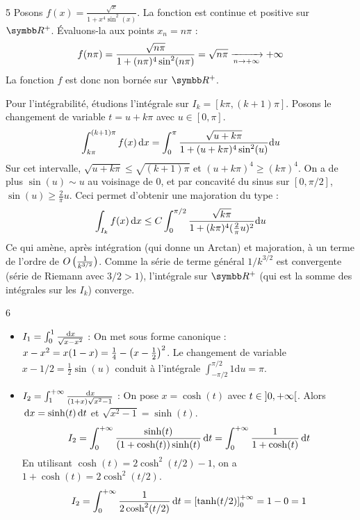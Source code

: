 \begin{correction}{5}
Posons $f(x) = \frac{\sqrt{x}}{1+x^4\sin^2(x)}$.
La fonction est continue et positive sur $\R^+$. Évaluons-la aux points $x_n = n\pi$ :
$$ f(n\pi) = \frac{\sqrt{n\pi}}{1 + (n\pi)^4\sin^2(n\pi)} = \sqrt{n\pi} \xrightarrow[n \to +\infty]{} +\infty $$
La fonction $f$ est donc non bornée sur $\R^+$.

Pour l'intégrabilité, étudions l'intégrale sur $I_k = [k\pi, (k+1)\pi]$. Posons le changement de variable $t = u + k\pi$ avec $u \in [0, \pi]$.
$$ \int_{k\pi}^{(k+1)\pi} f(x)\,\mathrm{d}x = \int_{0}^{\pi} \frac{\sqrt{u+k\pi}}{1 + (u+k\pi)^4\sin^2(u)}\mathrm{d}u $$
Sur cet intervalle, $\sqrt{u+k\pi} \le \sqrt{(k+1)\pi}$ et $(u+k\pi)^4 \ge (k\pi)^4$.
On a de plus $\sin(u) \sim u$ au voisinage de $0$, et par concavité du sinus sur $[0,\pi/2]$, $\sin(u) \ge \frac{2}{\pi}u$. Ceci permet d'obtenir une majoration du type :
$$ \int_{I_k} f(x)\,\mathrm{d}x \le C \int_{0}^{\pi/2} \frac{\sqrt{k\pi}}{1+(k\pi)^4(\frac{2}{\pi}u)^2}\mathrm{d}u $$
Ce qui amène, après intégration (qui donne un Arctan) et majoration, à un terme de l'ordre de $O\left(\frac{1}{k^{3/2}}\right)$.
Comme la série de terme général $1/k^{3/2}$ est convergente (série de Riemann avec $3/2 > 1$), l'intégrale sur $\R^+$ (qui est la somme des intégrales sur les $I_k$) converge.
\end{correction}

\begin{correction}{6}
\begin{itemize}
    \item $I_1 = \int_{0}^{1}\frac{\,\mathrm{d}x}{\sqrt{x-x^{2}}}$ :
    On met sous forme canonique : $x-x^2 = x(1-x) = \frac{1}{4} - \left(x-\frac{1}{2}\right)^2$.
    Le changement de variable $x - 1/2 = \frac{1}{2}\sin(u)$ conduit à l'intégrale $\int_{-\pi/2}^{\pi/2} 1 \mathrm{d}u = \pi$.
    
    \item $I_2 = \int_{1}^{+\infty}\frac{\,\mathrm{d}x}{(1+x)\sqrt{x^{2}-1}}$ :
    On pose $x = \cosh(t)$ avec $t \in \left]0, +\infty\right[$. Alors $\,\mathrm{d}x = \sinh(t)\,\mathrm{d}t$ et $\sqrt{x^2-1} = \sinh(t)$.
    $$ I_2 = \int_{0}^{+\infty} \frac{\sinh(t)}{(1+\cosh(t))\sinh(t)} \,\mathrm{d}t = \int_{0}^{+\infty} \frac{1}{1+\cosh(t)} \,\mathrm{d}t $$
    En utilisant $\cosh(t) = 2\cosh^2(t/2) - 1$, on a $1+\cosh(t) = 2\cosh^2(t/2)$.
    $$ I_2 = \int_{0}^{+\infty} \frac{1}{2\cosh^2(t/2)} \,\mathrm{d}t = \left[ \tanh(t/2) \right]_0^{+\infty} = 1 - 0 = 1 $$
\end{itemize}
\end{correction}

